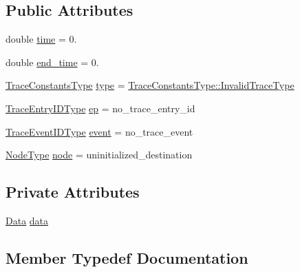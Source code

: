 \subsection*{Public Attributes}
\begin{DoxyCompactItemize}
\item 
double \hyperlink{structvt_1_1trace_1_1_log_a91a7891f5f287385c1323053e3c675c0}{time} = 0.
\item 
double \hyperlink{structvt_1_1trace_1_1_log_a86325bb2e6116b587f168bc2f1701f3a}{end\+\_\+time} = 0.
\item 
\hyperlink{namespacevt_1_1trace_acf454dfbd581b0ebae895f90b5927a1d}{Trace\+Constants\+Type} \hyperlink{structvt_1_1trace_1_1_log_a6415eacd3721d71029ff6edb909fc63d}{type} = \hyperlink{namespacevt_1_1trace_acf454dfbd581b0ebae895f90b5927a1da319f6b5fbfb85275879d449149167c7e}{Trace\+Constants\+Type\+::\+Invalid\+Trace\+Type}
\item 
\hyperlink{namespacevt_1_1trace_a3c14050715ba9eceaeff51fb3de64f2f}{Trace\+Entry\+I\+D\+Type} \hyperlink{structvt_1_1trace_1_1_log_aaeb605b768747d37e7b4bb062f14bb32}{ep} = no\+\_\+trace\+\_\+entry\+\_\+id
\item 
\hyperlink{namespacevt_1_1trace_a64a7185f3e102df8d8258f263ccd1582}{Trace\+Event\+I\+D\+Type} \hyperlink{structvt_1_1trace_1_1_log_a88aa88893277f0feb9776e96048a9294}{event} = no\+\_\+trace\+\_\+event
\item 
\hyperlink{namespacevt_a866da9d0efc19c0a1ce79e9e492f47e2}{Node\+Type} \hyperlink{structvt_1_1trace_1_1_log_a39a932cb9c4775f83117d0be477bc8c8}{node} = uninitialized\+\_\+destination
\end{DoxyCompactItemize}
\subsection*{Private Attributes}
\begin{DoxyCompactItemize}
\item 
\hyperlink{unionvt_1_1trace_1_1_log_1_1_data}{Data} \hyperlink{structvt_1_1trace_1_1_log_ac79b001b6167a37e337bc9d704af8535}{data}
\end{DoxyCompactItemize}


\subsection{Member Typedef Documentation}
\mbox{\label{structvt_1_1trace_1_1_log_a06f69176ce883a9e8a45ffb726fdc558}} 
